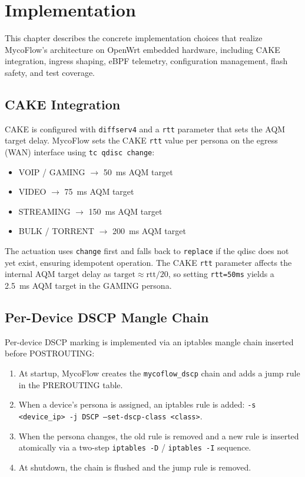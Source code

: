 
\chapter{Implementation}\label{chapter:implementation}

This chapter describes the concrete implementation choices that realize MycoFlow's architecture on OpenWrt embedded hardware, including CAKE integration, ingress shaping, eBPF telemetry, configuration management, flash safety, and test coverage.

\section{CAKE Integration}

CAKE is configured with \texttt{diffserv4} and a \texttt{rtt} parameter that sets the AQM target delay. MycoFlow sets the CAKE \texttt{rtt} value per persona on the egress (WAN) interface using \texttt{tc qdisc change}:

\begin{itemize}
  \item VOIP / GAMING $\to$ 50~ms AQM target
  \item VIDEO $\to$ 75~ms AQM target
  \item STREAMING $\to$ 150~ms AQM target
  \item BULK / TORRENT $\to$ 200~ms AQM target
\end{itemize}

The actuation uses \texttt{change} first and falls back to \texttt{replace} if the qdisc does not yet exist, ensuring idempotent operation. The CAKE \texttt{rtt} parameter affects the internal AQM target delay as $\text{target} \approx \text{rtt}/20$, so setting \texttt{rtt=50ms} yields a 2.5~ms AQM target in the GAMING persona.

\section{Per-Device DSCP Mangle Chain}

Per-device DSCP marking is implemented via an iptables mangle chain inserted before POSTROUTING:

\begin{enumerate}
  \item At startup, MycoFlow creates the \texttt{mycoflow\_dscp} chain and adds a jump rule in the PREROUTING table.
  \item When a device's persona is assigned, an iptables rule is added: \texttt{-s <device\_ip> -j DSCP --set-dscp-class <class>}.
  \item When the persona changes, the old rule is removed and a new rule is inserted atomically via a two-step \texttt{iptables -D} / \texttt{iptables -I} sequence.
  \item At shutdown, the chain is flushed and the jump rule is removed.
\end{enumerate}


